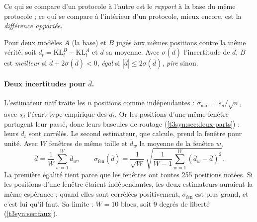 Ce qui se compare d'un protocole à l'autre est le \emph{rapport} à la base du même protocole ; ce qui se compare à l'intérieur d'un protocole, mieux encore, est la \emph{différence appariée}.

\begin{definition}\label{t3syn:def:regle}
Pour deux modèles $A$ (la base) et $B$ jugés aux mêmes positions contre la même vérité, soit $d_t = \mathrm{KL}^B_t - \mathrm{KL}^A_t$ et $\bar d$ sa moyenne. Avec $\sigma(\bar d)$ l'incertitude de $\bar d$, $B$ est \emph{meilleur} si $\bar d + 2\sigma(\bar d) < 0$, \emph{égal} si $|\bar d| \le 2\sigma(\bar d)$, \emph{pire} sinon.
\end{definition}

\paragraph{Deux incertitudes pour $\bar d$.} L'estimateur naïf traite les $n$ positions comme indépendantes : $\sigma_{\text{naïf}} = s_d/\sqrt n$, avec $s_d$ l'écart-type empirique des $d_t$. Or les positions d'une même fenêtre partagent leur passé, donc leurs bascules de routage (\cref{t3syn:sec:deux-parts}) : leurs $d_t$ sont corrélés. Le second estimateur, que  calcule, prend la fenêtre pour unité. Avec $W$ fenêtres de même taille et $\bar d_w$ la moyenne de la fenêtre $w$,
\begin{equation}\label{t3syn:eq:blocs}
\bar d = \frac1W \sum_{w=1}^{W} \bar d_w, \qquad
\sigma_{\text{fen}}(\bar d) = \frac{1}{\sqrt W}\,\sqrt{\frac{1}{W-1}\sum_{w=1}^{W} (\bar d_w - \bar d)^2}.
\end{equation}
La première égalité tient parce que les fenêtres ont toutes 255 positions notées. Si les positions d'une fenêtre étaient indépendantes, les deux estimateurs auraient la même espérance ; quand elles sont corrélées positivement, $\sigma_{\text{fen}}$ est plus grand, et c'est lui qu'il faut. Sa limite : $W = 10$ blocs, soit 9 degrés de liberté (\cref{t3syn:sec:faux}).

